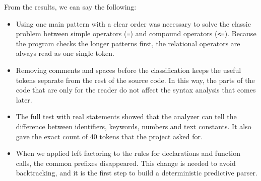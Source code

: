 \documentclass[letterpaper,12pt,oneside]{article}
\begin{document}
From the results, we can say the following:

\begin{itemize}
    \item Using one main pattern with a clear order was necessary to solve the classic problem between simple operators (\texttt{=}) and compound operators (\texttt{<=}). Because the program checks the longer patterns first, the relational operators are always read as one single token.
    \item Removing comments and spaces before the classification keeps the useful tokens separate from the rest of the source code. In this way, the parts of the code that are only for the reader do not affect the syntax analysis that comes later.
    \item The full test with real statements showed that the analyzer can tell the difference between identifiers, keywords, numbers and text constants. It also gave the exact count of 40 tokens that the project asked for.
    \item When we applied left factoring to the rules for declarations and function calls, the common prefixes disappeared. This change is needed to avoid backtracking, and it is the first step to build a deterministic predictive parser.
\end{itemize}

\printbibliography
\end{document}
